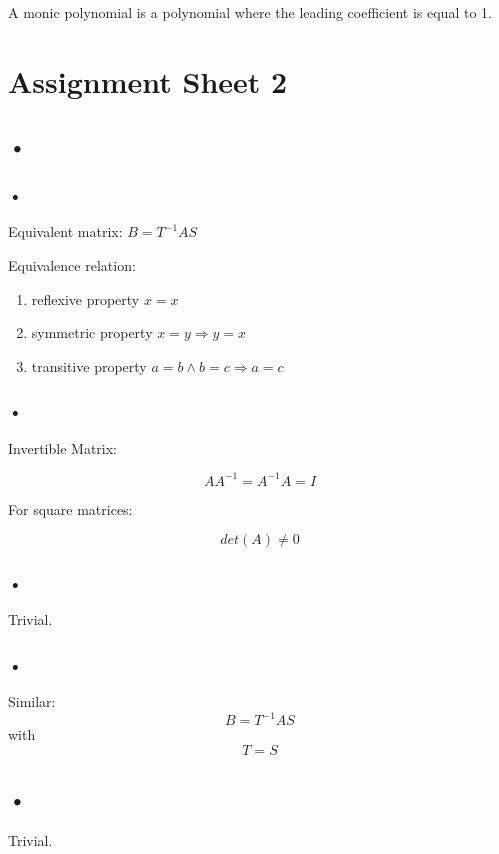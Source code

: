 \documentclass{report}
\begin{document}
\section{}

\subsection{}
A monic polynomial is a polynomial where the leading coefficient is equal to 1.
\subsection{}


\chapter{Assignment Sheet 2}
\section{•}
\subsection{•}
Equivalent matrix:
$B=T^{-1}AS$

Equivalence relation:
\begin{enumerate}
\item reflexive property $x=x$
\item symmetric property $x=y \Rightarrow y=x$
\item transitive property $a=b \land b=c \Rightarrow a=c$
\end{enumerate}
\subsection{•}
Invertible Matrix:

$$AA^{-1}=A^{-1}A=I$$

For square matrices:

$$det(A) \neq 0$$
\subsection{•}
Trivial.
\subsection{•}
Similar:
$$B=T^{-1}AS$$ with $$T=S$$

\section{•}
Trivial.
\end{document}
